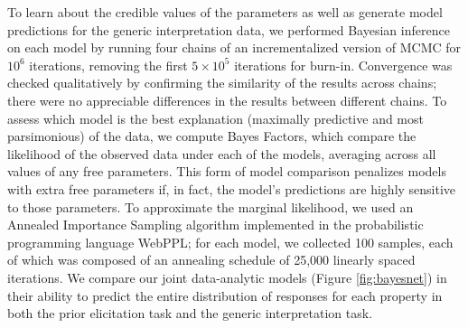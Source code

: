 \documentclass[floatsintext,doc]{apa6}
\begin{document}
To learn about the credible values of the parameters as well as generate model predictions for the generic interpretation data, we performed Bayesian inference on each model by running four chains of an incrementalized version of MCMC \cite{Ritchie2016} for $10^6$ iterations, removing the first $5 \times 10^5$ iterations for burn-in.
Convergence was checked qualitatively by confirming the similarity of the results across chains; there were no appreciable differences in the results between different chains.
To assess which model is the best explanation (maximally predictive and most parsimonious) of the data, we compute Bayes Factors, which compare the likelihood of the observed data under each of the models, averaging across all values of any free parameters.
This form of model comparison penalizes models with extra free parameters if, in fact, the model's predictions are highly sensitive to those parameters.
To approximate the marginal likelihood, we used an Annealed Importance Sampling algorithm \cite{neal2001annealed} implemented in the probabilistic programming language WebPPL; for each model, we collected 100 samples, each of which was composed of an annealing schedule of 25,000 linearly spaced iterations.
We compare our joint data-analytic models (Figure \ref{fig:bayesnet}) in their ability to predict the entire distribution of responses for each property in both the prior elicitation task and the generic interpretation task. 
\end{document}
